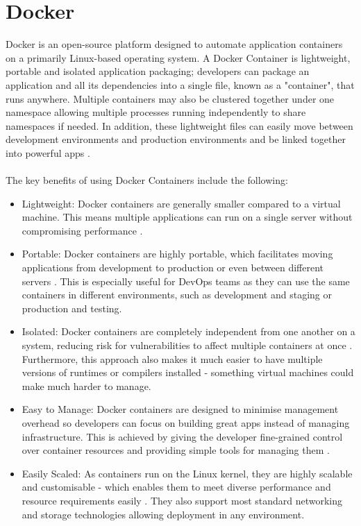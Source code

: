 \documentclass[BIF,Bachelor,nenglish]{twbook}%
\begin{document}
\section{Docker}
Docker is an open-source platform designed to automate application containers on a primarily Linux-based operating system. A Docker Container is lightweight, portable and isolated application packaging; developers can package an application and all its dependencies into a single file, known as a "container", that runs anywhere. Multiple containers may also be clustered together under one namespace allowing multiple processes running independently to share namespaces if needed. In addition, these lightweight files can easily move between development environments and production environments and be linked together into powerful apps \cite{rad2017}.
\\
\\
The key benefits of using Docker Containers include the following:

\begin{itemize}
\item Lightweight: Docker containers are generally smaller compared to a virtual machine. This means multiple applications can run on a single server without compromising performance \cite{vmwcovsvm}.

\item Portable: Docker containers are highly portable, which facilitates moving applications from development to production or even between different servers \cite{rad2017}. This is especially useful for DevOps teams as they can use the same containers in different environments, such as development and staging or production and testing.

\item Isolated: Docker containers are completely independent from one another on a system, reducing risk for vulnerabilities to affect multiple containers at once \cite{com2016}. Furthermore, this approach also makes it much easier to have multiple versions of runtimes or compilers installed - something virtual machines could make much harder to manage.

\item Easy to Manage: Docker containers are designed to minimise management overhead so developers can focus on building great apps instead of managing infrastructure. This is achieved by giving the developer fine-grained control over container resources and providing simple tools for managing them \cite{rad2017}.

\item Easily Scaled: As containers run on the Linux kernel, they are highly scalable and customisable - which enables them to meet diverse performance and resource requirements easily \cite{rad2017}. They also support most standard networking and storage technologies allowing deployment in any environment.
\end{itemize}
\end{document}

